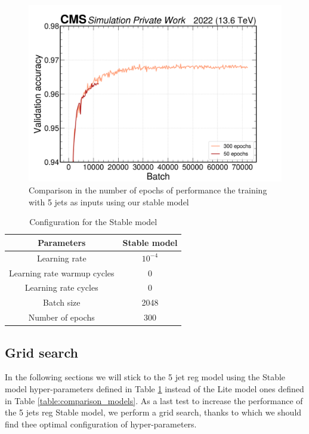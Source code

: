 \begin{figure}[hbt]
    \centering
    \includegraphics[width=0.7\linewidth]{Images/6.Improving/Variability Study/epoch comp.png}
    \caption{Comparison in the number of epochs of performance the training with 5 jets as inputs using our stable model}
    \label{fig: epoch diff}
\end{figure}

\begin{table}[hbt]
\centering
\begin{tabular}{|c|c|}
 \hline
 Parameters  & Stable model  \\
 \hline
 Learning rate &  $10^{-4}$ \\
 \hline
 Learning rate warmup cycles &  0\\
 \hline
  Learning rate cycles & 0\\
 \hline
 Batch size & 2048 \\
 \hline
 Number of epochs & 300 \\
 \hline
\end{tabular}
\caption{Configuration for the Stable model}
\label{table: stable model}
\end{table}


\newpage

\subsection{Grid search} \label{subsection: grid search}

In the following sections we will stick to the 5 jet \pt reg model using the Stable model hyper-parameters defined in Table \ref{table: stable model} instead of the Lite model ones defined in Table \ref{table:comparison_models}. As a last test to increase the performance of the 5 jets \pt reg Stable model, we perform a grid search, thanks to which we should find thee optimal configuration of hyper-parameters.

